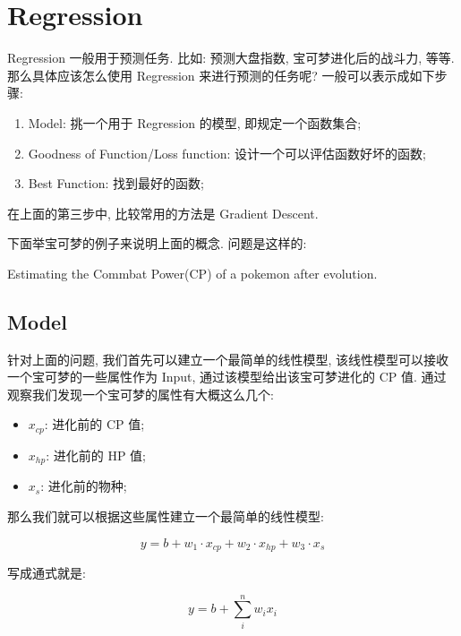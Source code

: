 \chapter{Regression}

Regression 一般用于预测任务. 比如: 预测大盘指数, 宝可梦进化后的战斗力, 等等. 那么具体应该怎么使用 Regression 
来进行预测的任务呢? 一般可以表示成如下步骤: 

\begin{enumerate}
    \item Model: 挑一个用于 Regression 的模型, 即规定一个函数集合; 
    \item Goodness of Function/Loss function: 设计一个可以评估函数好坏的函数;
    \item Best Function: 找到最好的函数;
\end{enumerate}

在上面的第三步中, 比较常用的方法是 Gradient Descent. 

下面举宝可梦的例子来说明上面的概念. 问题是这样的: 

\begin{example}
    Estimating the Commbat Power(CP) of a pokemon after evolution. 
\end{example}


\section{Model}\label{sec:Model}

针对上面的问题, 我们首先可以建立一个最简单的线性模型, 该线性模型可以接收一个宝可梦的一些属性作为 Input, 通过该模型给出该宝可梦进化的 CP 值. 通过观察我们发现一个宝可梦的属性有大概这么几个: 

\begin{itemize}
    \item $x_{ cp }$: 进化前的 CP 值;
    \item $x_{ hp }$: 进化前的 HP 值;
    \item $x_s$: 进化前的物种;
\end{itemize}

那么我们就可以根据这些属性建立一个最简单的线性模型: 

\begin{equation}
    y = b + w_1 \cdot x_{ cp } + w_2 \cdot x_{ hp } + w_3 \cdot x_s
\end{equation}

写成通式就是: 

\begin{equation}
    y = b + \sum_i^{n} w_ix_i
\end{equation}


